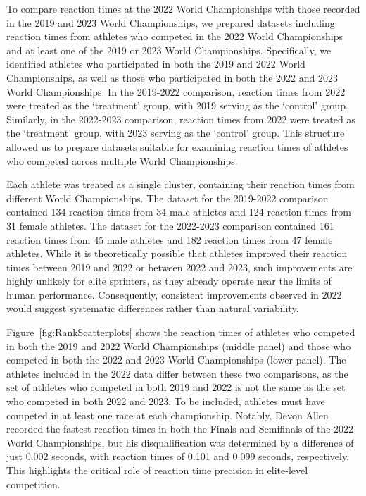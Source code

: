 \documentclass[12pt, letterpaper]{article}
\begin{document}
To compare reaction times at the 2022 World Championships with those 
recorded in the 2019 and 2023 World Championships, we prepared datasets 
including reaction times from athletes who competed in the 2022 World 
Championships and at least one of the 2019 or 2023 World Championships. 
Specifically, we identified athletes who participated in both the 2019 
and 2022 World Championships, as well as those who participated in both 
the 2022 and 2023 World Championships. In the 2019-2022 comparison, 
reaction times from 2022 were treated as the `treatment' group, with 
2019 serving as the `control' group. Similarly, in the 2022-2023 
comparison, reaction times from 2022 were treated as the `treatment' 
group, with 2023 serving as the `control' group. This structure allowed 
us to prepare datasets suitable for examining reaction times of athletes 
who competed across multiple World Championships.


Each athlete was treated as a single cluster, containing their reaction 
times from different World Championships. The dataset for the 2019-2022 
comparison contained 134 reaction times from 34 male athletes and 124 
reaction times from 31 female athletes. The dataset for the 2022-2023 
comparison contained 161 reaction times from 45 male athletes and 182 
reaction times from 47 female athletes. While it is theoretically 
possible that athletes improved their reaction times between 2019 and 
2022 or between 2022 and 2023, such improvements are highly unlikely for 
elite sprinters, as they already operate near the limits of human 
performance. Consequently, consistent improvements observed in 2022 
would suggest systematic differences rather than natural variability.


Figure~\ref{fig:RankScatterplots} shows the reaction times of athletes 
who competed in both the 2019 and 2022 World Championships (middle 
panel) and those who competed in both the 2022 and 2023 World 
Championships (lower panel). The athletes included in the 2022 data 
differ between these two comparisons, as the set of athletes who 
competed in both 2019 and 2022 is not the same as the set who competed 
in both 2022 and 2023. To be included, athletes must have competed in 
at least one race at each championship. Notably, Devon Allen recorded 
the fastest reaction times in both the Finals and Semifinals of the 
2022 World Championships, but his disqualification was determined by a 
difference of just 0.002 seconds, with reaction times of 0.101 and 
0.099 seconds, respectively. This highlights the critical role of 
reaction time precision in elite-level competition.
\end{document}

